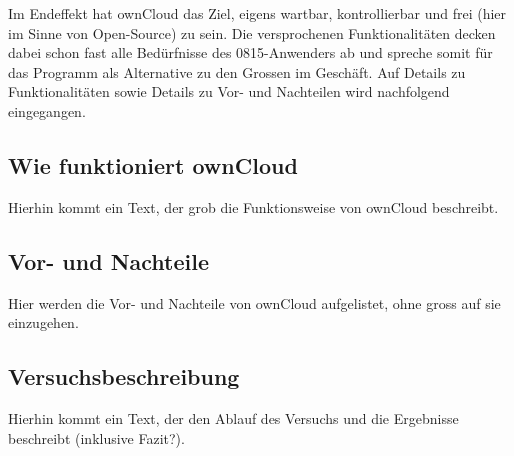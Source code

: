 Im Endeffekt hat ownCloud das Ziel, eigens wartbar, kontrollierbar und frei (hier im Sinne von Open-Source) zu sein. Die versprochenen Funktionalitäten decken dabei schon fast alle Bedürfnisse des 0815-Anwenders ab und spreche somit für das Programm als Alternative zu den Grossen im Geschäft. Auf Details zu Funktionalitäten sowie Details zu Vor- und Nachteilen wird nachfolgend eingegangen.

\subsection{Wie funktioniert ownCloud}
Hierhin kommt ein Text, der grob die Funktionsweise von ownCloud beschreibt.

\subsection{Vor- und Nachteile}
Hier werden die Vor- und Nachteile von ownCloud aufgelistet, ohne gross auf sie einzugehen.

\subsection{Versuchsbeschreibung}
Hierhin kommt ein Text, der den Ablauf des Versuchs und die Ergebnisse beschreibt (inklusive Fazit?).


